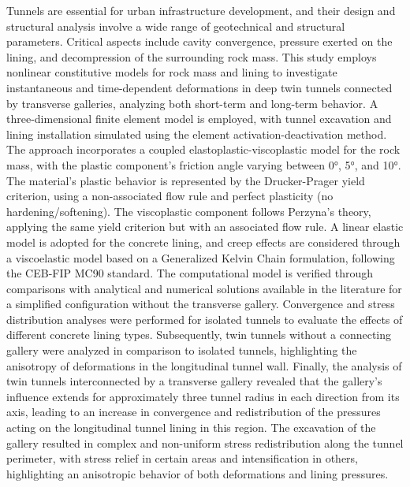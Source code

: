 %
%
%
%

Tunnels are essential for urban infrastructure development, and their design and structural analysis involve a wide range of geotechnical and structural parameters. Critical aspects include cavity convergence, pressure exerted on the lining, and decompression of the surrounding rock mass. This study employs nonlinear constitutive models for rock mass and lining to investigate instantaneous and time-dependent deformations in deep twin tunnels connected by transverse galleries, analyzing both short-term and long-term behavior. A three-dimensional finite element model is employed, with tunnel excavation and lining installation simulated using the element activation-deactivation method. The approach incorporates a coupled elastoplastic-viscoplastic model for the rock mass, with the plastic component’s friction angle varying between 0°, 5°, and 10°. The material’s plastic behavior is represented by the Drucker-Prager yield criterion, using a non-associated flow rule and perfect plasticity (no hardening/softening). The viscoplastic component follows Perzyna’s theory, applying the same yield criterion but with an associated flow rule. A linear elastic model is adopted for the concrete lining, and creep effects are considered through a viscoelastic model based on a Generalized Kelvin Chain formulation, following the CEB-FIP MC90 standard. The computational model is verified through comparisons with analytical and numerical solutions available in the literature for a simplified configuration without the transverse gallery. Convergence and stress distribution analyses were performed for isolated tunnels to evaluate the effects of different concrete lining types. Subsequently, twin tunnels without a connecting gallery were analyzed in comparison to isolated tunnels, highlighting the anisotropy of deformations in the longitudinal tunnel wall. Finally, the analysis of twin tunnels interconnected by a transverse gallery revealed that the gallery's influence extends for approximately three tunnel radius in each direction from its axis, leading to an increase in convergence and redistribution of the pressures acting on the longitudinal tunnel lining in this region. The excavation of the gallery resulted in complex and non-uniform stress redistribution along the tunnel perimeter, with stress relief in certain areas and intensification in others, highlighting an anisotropic behavior of both deformations and lining pressures.
%


